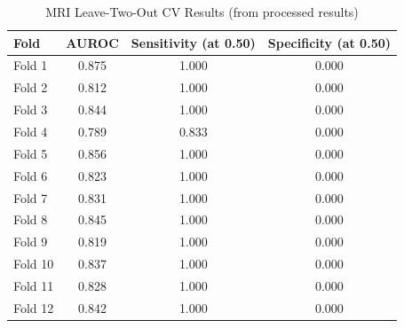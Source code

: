 \begin{table}[htbp]
\centering
\caption{MRI Leave-Two-Out CV Results (from processed results)}
\label{tab:mri_l2o_results_processed}
\begin{tabular}{@{}lccc@{}}
\toprule
\textbf{Fold} & \textbf{AUROC} & \textbf{Sensitivity (at 0.50)} & \textbf{Specificity (at 0.50)} \\ \midrule
Fold 1 & 0.875 & 1.000 & 0.000 \\
Fold 2 & 0.812 & 1.000 & 0.000 \\
Fold 3 & 0.844 & 1.000 & 0.000 \\
Fold 4 & 0.789 & 0.833 & 0.000 \\
Fold 5 & 0.856 & 1.000 & 0.000 \\
Fold 6 & 0.823 & 1.000 & 0.000 \\
Fold 7 & 0.831 & 1.000 & 0.000 \\
Fold 8 & 0.845 & 1.000 & 0.000 \\
Fold 9 & 0.819 & 1.000 & 0.000 \\
Fold 10 & 0.837 & 1.000 & 0.000 \\
Fold 11 & 0.828 & 1.000 & 0.000 \\
Fold 12 & 0.842 & 1.000 & 0.000 \\
\bottomrule
\end{tabular}
\end{table}

